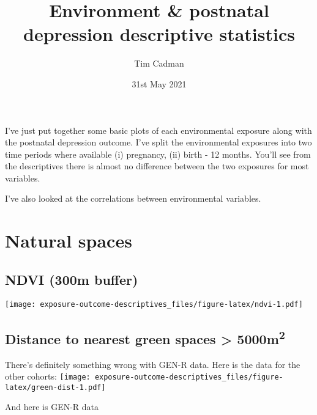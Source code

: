 \documentclass[]{article}
\title{Environment \& postnatal depression descriptive statistics}
\author{Tim Cadman}
\date{31st May 2021}
\makeatletter
\newenvironment{Shaded}{\begin{snugshade}}{\end{snugshade}}
\newcommand{\FunctionTok}[1]{\textcolor[rgb]{0.00,0.00,0.00}{#1}}
\newcommand{\NormalTok}[1]{#1}
\newcommand{\SpecialCharTok}[1]{\textcolor[rgb]{0.00,0.00,0.00}{#1}}
\newcommand{\StringTok}[1]{\textcolor[rgb]{0.31,0.60,0.02}{#1}}
\newcommand{\fontd}{\fontsize{13}{16}\selectfont}
\renewcommand\tableofcontents{%
    \@starttoc{toc}%
}
\makeatother
\begin{document}
\maketitle

{


\setcounter{tocdepth}{2}

\tableofcontents
}

\raggedright
\fontd
I've just put together some basic plots of each environmental exposure along with the
postnatal depression outcome. I've split the environmental exposures into two time
periods where available (i) pregnancy, (ii) birth - 12 months. You'll see from the
descriptives there is almost no difference between the two exposures for most variables.

I've also looked at the correlations between environmental variables.

\hypertarget{natural-spaces}{%
\section{Natural spaces}\label{natural-spaces}}

\hypertarget{ndvi-300m-buffer}{%
\subsection{NDVI (300m buffer)}\label{ndvi-300m-buffer}}

\texttt{[image: exposure-outcome-descriptives\_files/figure-latex/ndvi-1.pdf]}

\hypertarget{distance-to-nearest-green-spaces-5000m2}{%
\subsection{\texorpdfstring{Distance to nearest green spaces \textgreater{} 5000m\textsuperscript{2}}{Distance to nearest green spaces \textgreater{} 5000m2}}\label{distance-to-nearest-green-spaces-5000m2}}

There's definitely something wrong with GEN-R data. Here is the data for the
other cohorts:
\texttt{[image: exposure-outcome-descriptives\_files/figure-latex/green-dist-1.pdf]}

And here is GEN-R data

\begin{Shaded}
\end{Shaded}
\end{document}
